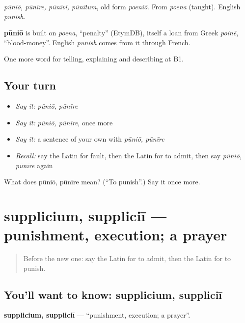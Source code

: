 \emph{pūniō, pūnīre, pūnīvī, pūnītum}, old form \emph{poeniō}. From \emph{poena} (taught). English \emph{punish}.

\begin{cousinweb}
\textbf{pūniō} is built on \emph{poena}, \textquotedblleft{}penalty\textquotedblright{} (EtymDB), itself a loan from Greek \emph{poinē}, \textquotedblleft{}blood-money\textquotedblright{}. English \emph{punish} comes from it through French.
\end{cousinweb}

\begin{grammarlens}[title={What you've built}]
One more word for telling, explaining and describing at B1.
\end{grammarlens}

\subsection*{Your turn}
\begin{itemize}
\raggedright
  \item \emph{Say it:} \emph{pūniō, pūnīre}
  \item \emph{Say it:} \emph{pūniō, pūnīre}, once more
  \item \emph{Say it:} a sentence of your own with \emph{pūniō, pūnīre}
  \item \emph{Recall:} say the Latin for fault, then the Latin for to admit, then say \emph{pūniō, pūnīre} again
\end{itemize}

\begin{tcolorbox}[breakable,colback=teal!4,colframe=teal!35!black,title={Before you move on}]
What does pūniō, pūnīre mean? (\textquotedblleft{}To punish\textquotedblright{}.) Say it once more.
\end{tcolorbox}
\section[supplicium, suppliciī]{supplicium, suppliciī — punishment, execution; a prayer}

\label{lesson:LA-C312-supplicium}



\begin{quote}
Before the new one: say the Latin for to admit, then the Latin for to punish.
\end{quote}

\subsection*{You'll want to know: supplicium, suppliciī}
\textbf{supplicium, suppliciī} — \textquotedblleft{}punishment, execution; a prayer\textquotedblright{}.

